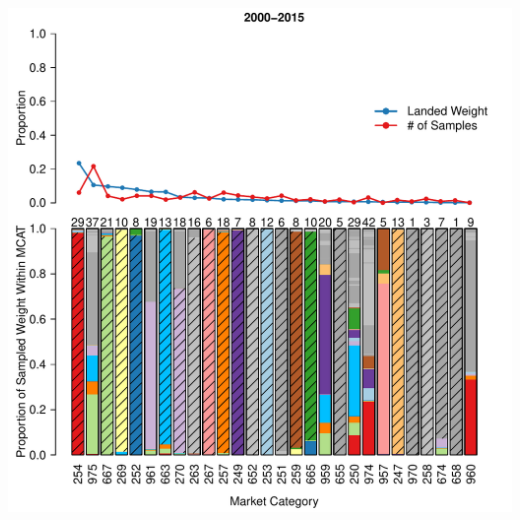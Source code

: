 \documentclass[ xcolor = pdftex, dvipsnames, table ]{beamer}
\begin{document}
%
\begin{frame}
\centering
\includegraphics[height=\textheight]{../pictures/2000to2015Bar3.pdf}

\end{frame}
\end{document}
